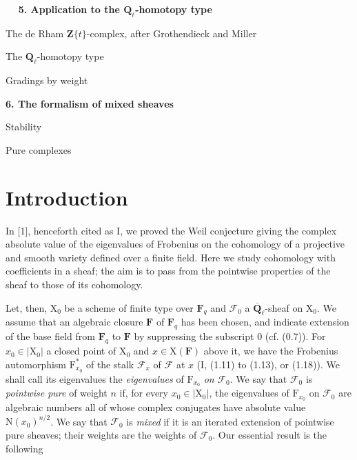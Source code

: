 \documentclass[11pt,leqno]{article}
\newcommand{\Page}[1]{\ifvmode\noindent\else\unskip\ \fi{\footnotesize\textcolor{gray}{[p.\,#1]}}\ \ignorespaces}
\begin{document}
\Page{138}
\begingroup
\small
\noindent\textbf{5. Application to the \(\mathbf{Q}_\ell\)-homotopy type}\dotfill{}\par
\noindent\hspace*{1em}The de Rham \(\mathbf{Z}\{t\}\)-complex, after Grothendieck and Miller\dotfill{}\par
\noindent\hspace*{1em}The \(\mathbf{Q}_\ell\)-homotopy type\dotfill{}\par
\noindent\hspace*{1em}Gradings by weight\dotfill{}\par
\medskip
\noindent\textbf{6. The formalism of mixed sheaves}\dotfill{}\par
\noindent\hspace*{1em}Stability\dotfill{}\par
\noindent\hspace*{1em}Pure complexes\dotfill{}\par
\endgroup

\section*{Introduction}

In [1], henceforth cited as I, we proved the Weil conjecture giving the complex absolute value of the eigenvalues of Frobenius on the cohomology of a projective and smooth variety defined over a finite field. Here we study cohomology with coefficients in a sheaf; the aim is to pass from the pointwise properties of the sheaf to those of its cohomology.

Let, then, \(\mathrm{X}_0\) be a scheme of finite type over \(\mathbf{F}_q\) and \(\mathscr{F}_0\) a \(\overline{\mathbf{Q}}_\ell\)-sheaf on \(\mathrm{X}_0\). We assume that an algebraic closure \(\mathbf{F}\) of \(\mathbf{F}_q\) has been chosen, and indicate extension of the base field from \(\mathbf{F}_q\) to \(\mathbf{F}\) by suppressing the subscript 0 (cf. (0.7)). For \(x_0\in|\mathrm{X}_0|\) a closed point of \(\mathrm{X}_0\) and \(x\in\mathrm{X}(\mathbf{F})\) above it, we have the Frobenius automorphism \(\mathrm{F}_{x_0}^{*}\) of the stalk \(\mathscr{F}_x\) of \(\mathscr{F}\) at \(x\) (I, (1.11) to (1.13), or (1.18)). We shall call its eigenvalues the \textit{eigenvalues} of \(\mathrm{F}_{x_0}\) \textit{on} \(\mathscr{F}_0\). We say that \(\mathscr{F}_0\) is \textit{pointwise pure} of weight \(n\) if, for every \(x_0\in|\mathrm{X}_0|\), the eigenvalues of \(\mathrm{F}_{x_0}\) on \(\mathscr{F}_0\) are algebraic numbers all of whose complex conjugates have absolute value \(\mathrm{N}(x_0)^{n/2}\). We say that \(\mathscr{F}_0\) is \textit{mixed} if it is an iterated extension of pointwise pure sheaves; their weights are the weights of \(\mathscr{F}_0\). Our essential result is the following
\end{document}
